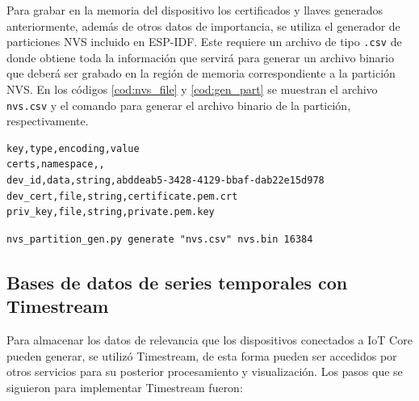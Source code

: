 Para grabar en la memoria del dispositivo los certificados y llaves generados anteriormente, además de otros datos de importancia, se utiliza el generador de particiones NVS incluido en ESP-IDF. Este requiere un archivo de tipo \texttt{.csv} de donde obtiene toda la información que servirá para generar un archivo binario que deberá ser grabado en la región de memoria correspondiente a la partición NVS. En los códigos \ref{cod:nvs_file} y \ref{cod:gen_part} se muestran el archivo \texttt{nvs.csv} y el comando para generar el archivo binario de la partición, respectivamente.

\begin{lstlisting}[label=cod:nvs_file,caption=Archivo nvs.csv.]
key,type,encoding,value    
certs,namespace,,  
dev_id,data,string,abddeab5-3428-4129-bbaf-dab22e15d978
dev_cert,file,string,certificate.pem.crt
priv_key,file,string,private.pem.key
\end{lstlisting}

\begin{lstlisting}[label=cod:gen_part,caption=Comando para crear una particion con el generador de particiones NVS]
nvs_partition_gen.py generate "nvs.csv" nvs.bin 16384
\end{lstlisting}

\subsection{Bases de datos de series temporales con Timestream}
Para almacenar los datos de relevancia que los dispositivos conectados a IoT Core pueden generar, se utilizó Timestream, de esta forma pueden ser accedidos por otros servicios para su posterior procesamiento y visualización. Los pasos que se siguieron para implementar Timestream fueron:

